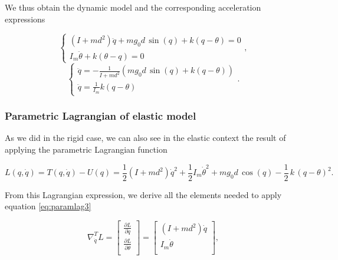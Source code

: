 \documentclass[a4paper]{article}
\begin{document}
We thus obtain the dynamic model and the corresponding acceleration expressions
\begin{center}
\begin{equation}
    \nonumber
    \begin{cases}
        (I+md^2)\ddot{q}+mg_0d\, \sin(q) +k(q-\theta)=0\\
        I_m\ddot{\theta}+k(\theta-q)=0
    \end{cases},
\end{equation}
\begin{equation}
    \label{eq:el_mod9}
    \begin{cases}
        \ddot{q}=-\frac{1}{I+md^2}(mg_0d\, \sin(q)+k(q-\theta))\\
        \ddot{q}=\frac{1}{I_m}k(q-\theta)
    \end{cases}.
\end{equation}
\end{center}

\subsubsection{Parametric Lagrangian of elastic model}
As we did in the rigid case, we can also see in the elastic context the result of applying the parametric Lagrangian function

\begin{equation}
    \nonumber
    L(q,\dot{q}) = T(q,\dot{q}) - U(q) = \frac{1}{2}(I+md^2)\dot{q}^2 + \frac{1}{2} I_m \dot{\theta}^2 + mg_0d\, \cos(q) - \frac{1}{2}\,k\,(q-\theta)^{2}.
\end{equation}

From this Lagrangian expression, we derive all the elements needed to apply equation \eqref{eq:paramlag3}

\begin{equation}
    \nonumber
    \nabla_{\dot{q}}^{T} L = 
    \begin{bmatrix}
        \frac{\partial L}{\partial \dot{q}} \\[3mm]
        \frac{\partial L}{\partial \dot{\theta}} \\
    \end{bmatrix} =
    \begin{bmatrix}
        (I+md^2)\dot{q}\\[1mm]
        I_m\dot{\theta}\\
    \end{bmatrix},
\end{equation}
\end{document}
